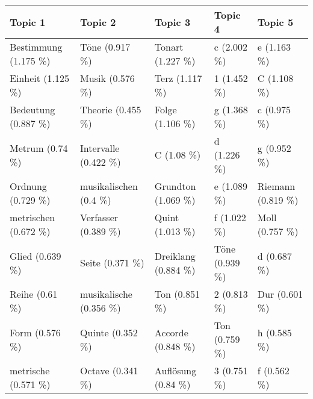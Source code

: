 \begin{tabular}{lllll}
\toprule
             Topic 1 &                Topic 2 &             Topic 3 &        Topic 4 &           Topic 5 \\
\midrule
Bestimmung (1.175 \%) &         Töne (0.917 \%) &    Tonart (1.227 \%) &    c (2.002 \%) &       e (1.163 \%) \\
   Einheit (1.125 \%) &        Musik (0.576 \%) &      Terz (1.117 \%) &    1 (1.452 \%) &       C (1.108 \%) \\
 Bedeutung (0.887 \%) &      Theorie (0.455 \%) &     Folge (1.106 \%) &    g (1.368 \%) &       c (0.975 \%) \\
     Metrum (0.74 \%) &   Intervalle (0.422 \%) &          C (1.08 \%) &    d (1.226 \%) &       g (0.952 \%) \\
   Ordnung (0.729 \%) &  musikalischen (0.4 \%) &  Grundton (1.069 \%) &    e (1.089 \%) & Riemann (0.819 \%) \\
metrischen (0.672 \%) &    Verfasser (0.389 \%) &     Quint (1.013 \%) &    f (1.022 \%) &    Moll (0.757 \%) \\
     Glied (0.639 \%) &        Seite (0.371 \%) & Dreiklang (0.884 \%) & Töne (0.939 \%) &       d (0.687 \%) \\
      Reihe (0.61 \%) & musikalische (0.356 \%) &       Ton (0.851 \%) &    2 (0.813 \%) &     Dur (0.601 \%) \\
      Form (0.576 \%) &       Quinte (0.352 \%) &   Accorde (0.848 \%) &  Ton (0.759 \%) &       h (0.585 \%) \\
 metrische (0.571 \%) &       Octave (0.341 \%) &  Auflösung (0.84 \%) &    3 (0.751 \%) &       f (0.562 \%) \\
\bottomrule
\end{tabular}
